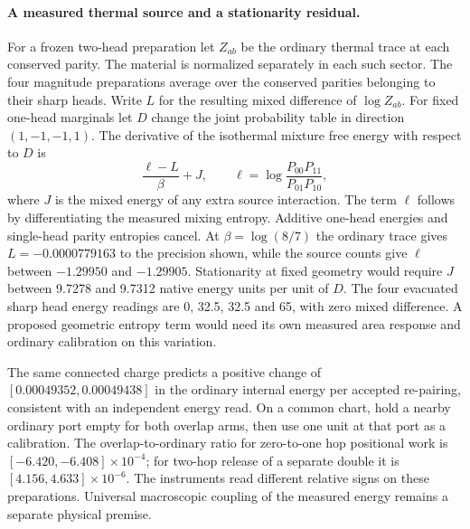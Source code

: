 \documentclass[11pt]{article}
\begin{document}
\paragraph{A measured thermal source and a stationarity residual.}
For a frozen two-head preparation let $Z_{ab}$ be the ordinary
thermal trace at each conserved parity. The material is normalized
separately in each such sector. The four magnitude preparations
average over the conserved parities belonging to their sharp heads.
Write $L$ for the resulting mixed difference of $\log Z_{ab}$.
For fixed one-head marginals let $D$ change the joint probability
table in direction $(1,-1,-1,1)$. The derivative of the isothermal
mixture free energy with respect to $D$ is
\[
 \frac{\ell-L}{\beta}+J,\qquad
 \ell=\log\frac{P_{00}P_{11}}{P_{01}P_{10}},
\]
where $J$ is the mixed energy of any extra source interaction.
The term $\ell$ follows by differentiating the measured mixing
entropy. Additive one-head energies and single-head parity entropies
cancel. At $\beta=\log(8/7)$ the ordinary trace gives
$L=-0.0000779163$ to the precision shown, while the source counts
give $\ell$ between $-1.29950$ and $-1.29905$. Stationarity at fixed
geometry would require $J$ between 9.7278 and 9.7312 native energy
units per unit of $D$. The four evacuated sharp head energy readings
are 0, 32.5, 32.5 and 65, with zero mixed difference. A proposed
geometric entropy term would need its own measured area response
and ordinary calibration on this variation.

The same connected charge predicts a positive change of
$[0.00049352,0.00049438]$ in the ordinary internal energy per
accepted re-pairing, consistent with an independent energy read.
On a common chart, hold a nearby ordinary port empty for both
overlap arms, then use one unit at that port as a calibration.
The overlap-to-ordinary ratio for zero-to-one hop positional work
is $[-6.420,-6.408]\times10^{-4}$; for two-hop release of a separate
double it is $[4.156,4.633]\times10^{-6}$. The instruments read
different relative signs on these preparations. Universal
macroscopic coupling of the measured energy remains a separate
physical premise.
\end{document}
